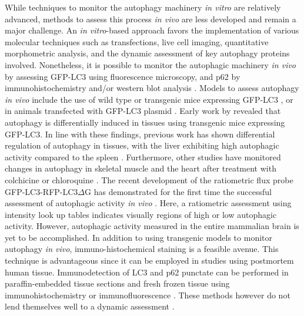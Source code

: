 While techniques to monitor the autophagy machinery \textit{in vitro} are relatively advanced, methods to assess this process \textit{in vivo} are less developed and remain a major challenge. An \textit{in vitro}-based approach favors the implementation of various molecular techniques such as transfections, live cell imaging, quantitative morphometric analysis, and the dynamic assessment of key autophagy proteins involved. Nonetheless, it is possible to monitor the autophagic machinery \textit{in vivo} by assessing GFP-LC3 using fluorescence microscopy, and p62 by immunohistochemistry and/or western blot analysis \citep{klionsky2016}. Models to assess autophagy \textit{in vivo} include the use of wild type or transgenic mice expressing GFP-LC3 \citep{Mizushima2004a,Rodriguez-Muela2012}, or in animals transfected with GFP-LC3 plasmid \citep{Mammucari2007}. Early work by \citet{Mizushima2004a} revealed that autophagy is differentially induced in tissues using transgenic mice expressing GFP-LC3. In line with these findings, previous work has shown differential regulation of autophagy in tissues, with the liver exhibiting high autophagic activity compared to the spleen \citep{Haspel2011}. Furthermore, other studies have monitored changes in autophagy in skeletal muscle and the heart after treatment with colchicine \citep{Ju2010} or chloroquine \citep{Kanamori2015}. The recent development of the ratiometric flux probe GFP-LC3-RFP-LC3$\Delta$G has demonstrated for the first time the successful assessment of autophagic activity \textit{in vivo} \citep{Kaizuka2016}. Here, a ratiometric assessment using intensity look up tables indicates visually regions of high or low autophagic activity. However, autophagic activity measured in the entire mammalian brain is yet to be accomplished. In addition to using transgenic models to monitor autophagy \textit{in vivo}, immuno-histochemical staining is a feasible avenue. This technique is advantageous since it can be employed in studies using postmortem human tissue. Immunodetection of LC3 and p62 punctate can be performed in paraffin-embedded tissue sections and fresh frozen tissue using immunohistochemistry or immunofluorescence \citep{He2016,Holt2011,Martinet2006,Schlafli2015}. These methods however do not lend themselves well to a dynamic assessment \citep{klionsky2016}.

